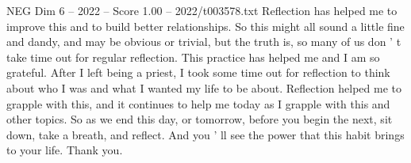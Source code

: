 \begin{textsample}{NEG Dim 6 – 2022 – Score 1.00 – 2022/t003578.txt}
Reflection has helped me to improve this and to build better relationships.
So this might all sound a little fine and dandy, and may be obvious or trivial, but the truth is, so many of us don ' t take time out for regular reflection.
This practice has helped me and I am so grateful.
After I left being a priest, I took some time out for reflection to think about who I was and what I wanted my life to be about.
Reflection helped me to grapple with this, and it continues to help me today as I grapple with this and other topics.
So as we end this day, or tomorrow, before you begin the next, sit down, take a breath, and reflect.
And you ' ll see the power that this habit brings to your life.
Thank you.

\end{textsample}

